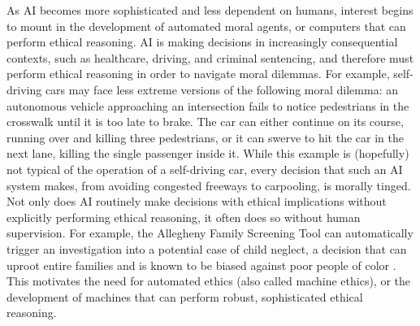 %
\begin{isabellebody}%
%
%
\isadelimtheory
%
\endisadelimtheory
%
\isatagtheory
%
\endisatagtheory
{\isafoldtheory}%
%
\isadelimtheory
%
\endisadelimtheory
%
\isadelimdocument
%
\endisadelimdocument
%
\isatagdocument
%
\isamarkuptrue%
%
\endisatagdocument
{\isafolddocument}%
%
\isadelimdocument
%
\endisadelimdocument
%
\begin{isamarkuptext}%
As AI becomes more sophisticated and less dependent on humans, interest begins to mount
in the development of automated moral agents, or computers that can perform ethical reasoning. 
AI is making decisions in increasingly 
consequential contexts, such as healthcare, driving, and criminal sentencing, and therefore 
must perform ethical reasoning in order to navigate moral dilemmas. For example, self-driving
cars may face less extreme versions of the following moral dilemma: an autonomous vehicle approaching 
an intersection fails to notice pedestrians in the crosswalk until it is too late to brake. The car 
can either continue on its course, running over and killing three pedestrians, or it can swerve to 
hit the car in the next lane, killing the single passenger inside it. While this example is (hopefully) 
not typical of the operation of a self-driving car, every decision that such an AI system makes, from 
avoiding congested freeways to carpooling, is morally tinged. Not only does AI routinely make decisions with 
ethical implications without explicitly performing ethical
reasoning, it often does so without human supervision. For example, the Allegheny Family Screening 
Tool can automatically trigger an investigation into a potential case of child neglect, a decision that 
can uproot entire families and is known to be biased against poor people of color \citep{eubanks}. 
This motivates the need for automated ethics (also called machine ethics), 
or the development of machines that can perform robust, sophisticated ethical reasoning. 


\end{isamarkuptext}
\end{isabellebody}

